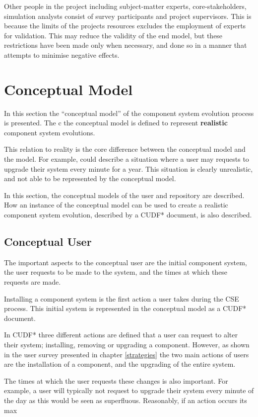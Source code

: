 Other people in the project including subject-matter experts, core-stakeholders, simulation analysts consist of survey participants and project supervisors.
This is because the limits of the projects resources excludes the employment of experts for validation.
This may reduce the validity of the end model, but these restrictions have been made only when necessary,
and done so in a manner that attempts to minimise negative effects.

\section{Conceptual Model}
In this section the ``conceptual model'' of the component system evolution process is presented.
The c the conceptual model is defined to represent \textbf{realistic} component system evolutions.

This relation to reality is the core difference between the conceptual model and the \modelname model.
For example, \modelname could describe a situation where a user may requests to upgrade their system every minute for a year.
This situation is clearly unrealistic, and not able to be represented by the conceptual model.

In this section, the conceptual models of the user and repository are described.
How an instance of the conceptual model can be used to create a realistic component system evolution, described by a CUDF* document, is also described.

\subsection{Conceptual User}
The important aspects to the conceptual user are the initial component system, the user requests to be made to the system, and the times at which these requests are made. 

Installing a component system is the first action a user takes during the CSE process.
This initial system is represented in the conceptual model as a CUDF* document.

In CUDF* three different actions are defined that a user can request to alter their system; installing, removing or upgrading a component.
However, as shown in the user survey presented in chapter \ref{strategies} the two main actions of users are the installation of a component, and the upgrading of the entire system.

The times at which the user requests these changes is also important.
For example, a user will typically not request to upgrade their system every minute of the day as this would be seen as superfluous.
Reasonably, if an action occurs its max

